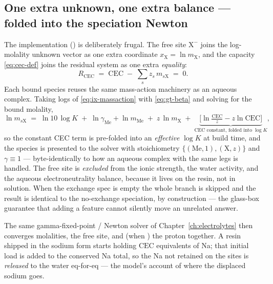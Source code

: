 \documentclass[11pt,a4paper]{article}
\begin{document}
\subsection{One extra unknown, one extra balance --- folded into the
speciation Newton}

The implementation ()
is deliberately frugal.  The free site $\mathrm{X^-}$ joins the
log-molality unknown vector as one extra coordinate $x_{\mathrm X}=\ln
m_{\mathrm X}$, and the capacity \eqref{eq:cec-def} joins the residual
system as one extra \emph{equality}:
\begin{equation}
   R_{\mathrm{CEC}} \;=\; \mathrm{CEC} \;-\; \sum_s z_s\,m_{s\mathrm X}
   \;=\; 0.
   \label{eq:ix-cec-residual}
\end{equation}
Each bound species reuses the same mass-action machinery as an aqueous
complex.  Taking logs of \eqref{eq:ix-massaction} with
\eqref{eq:gt-beta} and solving for the bound molality,
\begin{equation}
   \ln m_{s\mathrm X}
   \;=\; \ln 10\,\log K
   \;+\; \ln\gamma_{\mathrm{Me}} + \ln m_{\mathrm{Me}}
   \;+\; z\,\ln m_{\mathrm X}
   \;+\; \underbrace{\Big[\ln\tfrac{\mathrm{CEC}}{z}
        - z\ln \mathrm{CEC}\Big]}_{\text{CEC constant, folded into }\log K},
   \label{eq:ix-lnm}
\end{equation}
so the constant CEC term is pre-folded into an \emph{effective} $\log
K$ at build time, and the species is presented to the solver with
stoichiometry $\{(\mathrm{Me},1),(\mathrm X,z)\}$ and $\gamma\equiv 1$
--- byte-identically to how an aqueous complex with the same legs is
handled.  The free site is \emph{excluded} from the ionic strength,
the water activity, and the aqueous electroneutrality balance, because
it lives on the resin, not in solution.  When the exchange spec is empty
the whole branch is skipped and the result is identical to the
no-exchange speciation, by construction --- the glass-box guarantee that
adding a feature cannot silently move an unrelated answer.

The same gamma-fixed-point / Newton solver of
Chapter~\ref{ch:electrolytes} then converges molalities, the free site,
and (when ) the proton together.  A resin shipped in the
sodium form starts holding $\mathrm{CEC}$ equivalents of Na; that
initial load is added to the conserved Na total, so the Na not retained
on the sites is \emph{released} to the water eq-for-eq --- the model's
account of where the displaced sodium goes.
\end{document}
